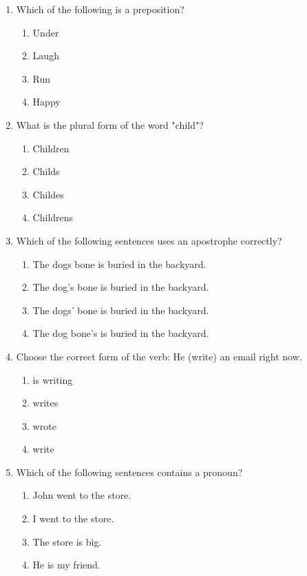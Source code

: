\documentclass[12pt]{article}
\begin{document}
\begin{enumerate}
    \item Which of the following is a preposition?
    \begin{enumerate}[label=\Alph*.]
        \item Under
        \item Laugh
        \item Run
        \item Happy
    \end{enumerate}
    \vspace{0.5cm}

    \item What is the plural form of the word "child"?
    \begin{enumerate}[label=\Alph*.]
        \item Children
        \item Childs
        \item Childes
        \item Childrens
    \end{enumerate}
    \vspace{0.5cm}

    \item Which of the following sentences uses an apostrophe correctly?
    \begin{enumerate}[label=\Alph*.]
        \item The dogs bone is buried in the backyard.
        \item The dog’s bone is buried in the backyard.
        \item The dogs' bone is buried in the backyard.
        \item The dog bone’s is buried in the backyard.
    \end{enumerate}
    \vspace{0.5cm}

    \item Choose the correct form of the verb: He \underline{\hspace{2cm}} (write) an email right now.
    \begin{enumerate}[label=\Alph*.]
        \item is writing
        \item writes
        \item wrote
        \item write
    \end{enumerate}
    \vspace{0.5cm}

    \item Which of the following sentences contains a pronoun?
    \begin{enumerate}[label=\Alph*.]
        \item John went to the store.
        \item I went to the store.
        \item The store is big.
        \item He is my friend.
    \end{enumerate}
    \vspace{0.5cm}


\end{enumerate}
\end{document}
